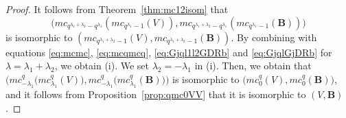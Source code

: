 \documentclass[pdftex]{sigma}
\numberwithin{equation}{section}
\theoremstyle{definition}
\begin{document}
\begin{proof}
It follows from Theorem~\ref{thm:mc12isom} that
\[
\bigl(mc _{q^{\lambda _1 + \lambda _2} - q^{\lambda _1 }} (mc _{q^{\lambda _1} -1} (V)) , mc _{ q^{\lambda _1 + \lambda _2} - q^{\lambda _1 }} (mc _{q^{\lambda _1} -1} (\boldsymbol{B} ))\bigr)
\]
 is isomorphic to $(mc _{q^{\lambda _1 + \lambda _2} -1 } (V), mc _{q^{\lambda _1 + \lambda _2} -1 } (\boldsymbol{B} ))$.
By combining with equations \eqref{eq:mcmc}, \eqref{eq:mcqmcq}, \eqref{eq:Gjql1l2GDRb} and \eqref{eq:GjqlGjDRb} for $\lambda = \lambda _1 +\lambda _2$, we obtain (i).
We set $\lambda _2 =-\lambda _1$ in (i).
Then, we obtain that~$\bigl(mc _{-\lambda _1} ^{q} \bigl(mc _{\lambda _1} ^{q} (V)\bigr), mc _{-\lambda _1} ^{q} \bigl(mc _{\lambda _1} ^{q} (\boldsymbol{B} )\bigr)\bigr)$ is isomorphic to $\bigl(mc _{0} ^{q} (V), mc _{0} ^{q} (\boldsymbol{B} )\bigr) $, and it follows from Proposition~\ref{prop:qmc0VV} that it is isomorphic to $(V, \boldsymbol{B} )$.
\end{proof}
\end{document}
